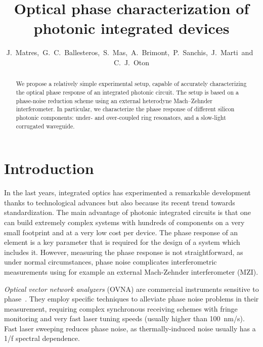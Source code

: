 \documentclass[journal]{IEEEtran}
\begin{document}
\title{Optical phase characterization of photonic integrated devices}
\author{J.~Matres,~G.~C.~Ballesteros,~S.~Mas,~A.~Brimont,~P.~Sanchis,~J.~Marti~and~C.~J.~Oton}
\maketitle

\begin{abstract}
We propose a relatively simple experimental setup, capable of accurately characterizing the optical phase response of an integrated photonic circuit.
The setup is based on a phase-noise reduction scheme using an external heterodyne Mach–Zehnder interferometer.
In particular, we characterize the phase response of different silicon photonic components: under- and over-coupled ring resonators, and a slow-light corrugated waveguide.
\end{abstract}

\section{Introduction}
\noindent In the last years, integrated optics has experimented a remarkable development thanks to technological advances but also because its recent trend towards standardization.
The main advantage of photonic integrated circuits is that one can build extremely complex systems with hundreds of components on a very small footprint and at a very low cost per device.
The phase response of an element is a key parameter that is required for the design of a system which includes it.
However, measuring the phase response is not straightforward, as under normal circumstances, phase noise complicates interferometric measurements using for example an external Mach-Zehnder interferometer (MZI).

\emph{Optical vector network analyzers} (OVNA) are commercial instruments sensitive to phase~\cite{Vanwiggeren2003, Gifford2005}.
They employ specific techniques to alleviate phase noise problems in their measurement, requiring complex synchronous receiving schemes with fringe monitoring and very fast laser tuning speeds (usually higher than 100~nm/s).
Fast laser sweeping reduces phase noise, as thermally-induced noise usually has a 1/f spectral dependence.
\end{document}
